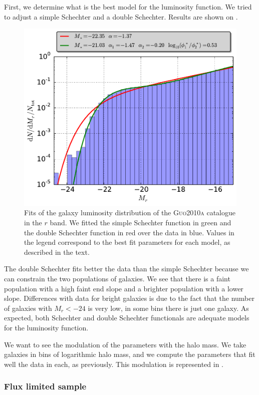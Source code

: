 First, we determine what is the best model for the luminosity function. We
tried to adjust a simple Schechter and a double Schechter. Results are
shown on .
%
\begin{figure}
    \centering
    \includegraphics[width=0.7\linewidth]{figures/lf/guo_all}
    \caption{Fits of the galaxy luminosity distribution of the
        \textsc{Guo2010a} catalogue in the $r$ band. We fitted the simple
        Schechter function in green and the double Schechter function in red
        over the data in blue. Values in the legend correspond to the best fit
    parameters for each model, as described in the text.\label{fig:guo_all}}
\end{figure}
%
The double Schechter fits better the data than the simple Schechter because we
can constrain the two populations of galaxies. We see that there is a faint
population with a high faint end slope and a brighter population with a lower
slope. Differences with data for bright galaxies is due to the fact that the
number of galaxies with $M_r<-24$ is very low, in some bins there is just one
galaxy. As expected, both Schechter and double Schechter functionals are
adequate models for the luminosity function.

We want to see the modulation of the parameters with the halo mass. We take
galaxies in bins of logarithmic halo mass, and we compute the
parameters that fit well the data in each, as previously. This modulation is
represented in .

\subsubsection{Flux limited sample}

